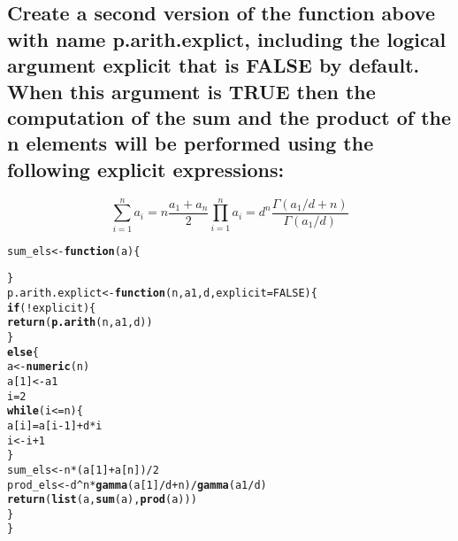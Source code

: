 \documentclass{article}\usepackage[]{graphicx}\usepackage[]{xcolor}
\makeatletter
\newcommand{\hlnum}[1]{\textcolor[rgb]{0.686,0.059,0.569}{#1}}%
\newcommand{\hlopt}[1]{\textcolor[rgb]{0,0,0}{#1}}%
\newcommand{\hldef}[1]{\textcolor[rgb]{0.345,0.345,0.345}{#1}}%
\newcommand{\hlkwa}[1]{\textcolor[rgb]{0.161,0.373,0.58}{\textbf{#1}}}%
\newcommand{\hlkwb}[1]{\textcolor[rgb]{0.69,0.353,0.396}{#1}}%
\newcommand{\hlkwc}[1]{\textcolor[rgb]{0.333,0.667,0.333}{#1}}%
\newcommand{\hlkwd}[1]{\textcolor[rgb]{0.737,0.353,0.396}{\textbf{#1}}}%
\newenvironment{kframe}{%
 \def\at@end@of@kframe{}%
 \ifinner\ifhmode%
  \def\at@end@of@kframe{\end{minipage}}%
  \begin{minipage}{\columnwidth}%
 \fi\fi%
 \def\FrameCommand##1{\hskip\@totalleftmargin \hskip-\fboxsep
 \colorbox{shadecolor}{##1}\hskip-\fboxsep
     \hskip-\linewidth \hskip-\@totalleftmargin \hskip\columnwidth}%
 \MakeFramed {\advance\hsize-\width
   \@totalleftmargin\z@ \linewidth\hsize
   \@setminipage}}%
 {\par\unskip\endMakeFramed%
 \at@end@of@kframe}
\newenvironment{knitrout}{}{} %
\makeatother
\begin{document}
\subsection{Create a second version of the function above with name p.arith.explict, including the logical argument explicit that is FALSE by default. When this argument is TRUE then the computation of the sum and the product of the n elements will be performed using the following explicit expressions:}
\[\sum_{i=1}^{n}a_i = n\frac{a_1+a_n}{2} \prod_{i=1}^{n}a_i = d^n\frac{\Gamma(a_1/d+n)}{\Gamma(a_1/d)}\]
\begin{knitrout}
\color{fgcolor}\begin{kframe}
\begin{alltt}
\hldef{sum_els}\hlkwb{<-}\hlkwa{function}\hldef{(}\hlkwc{a}\hldef{)\{}

\hldef{\}}
\hldef{p.arith.explict}\hlkwb{<-}\hlkwa{function}\hldef{(}\hlkwc{n}\hldef{,} \hlkwc{a1}\hldef{,} \hlkwc{d}\hldef{,} \hlkwc{explicit}\hldef{=}\hlnum{FALSE}\hldef{)\{}
  \hlkwa{if} \hldef{(}\hlopt{!}\hldef{explicit)\{}
    \hlkwd{return}\hldef{(}\hlkwd{p.arith}\hldef{(n,a1,d))}
  \hldef{\}}
  \hlkwa{else} \hldef{\{}
    \hldef{a}\hlkwb{<-}\hlkwd{numeric}\hldef{(n)}
    \hldef{a[}\hlnum{1}\hldef{]}\hlkwb{<-}\hldef{a1}
    \hldef{i}\hlkwb{=}\hlnum{2}
    \hlkwa{while} \hldef{(i}\hlopt{<=}\hldef{n)\{}
      \hldef{a[i]}\hlkwb{=}\hldef{a[i}\hlopt{-}\hlnum{1}\hldef{]}\hlopt{+}\hldef{d}\hlopt{*}\hldef{i}
      \hldef{i}\hlkwb{<-}\hldef{i}\hlopt{+}\hlnum{1}
    \hldef{\}}
    \hldef{sum_els}\hlkwb{<-}\hldef{n}\hlopt{*}\hldef{(a[}\hlnum{1}\hldef{]}\hlopt{+}\hldef{a[n])}\hlopt{/}\hlnum{2}
    \hldef{prod_els}\hlkwb{<-}\hldef{d}\hlopt{^}\hldef{n} \hlopt{*} \hlkwd{gamma}\hldef{(a[}\hlnum{1}\hldef{]}\hlopt{/}\hldef{d} \hlopt{+}\hldef{n)}\hlopt{/}\hlkwd{gamma}\hldef{(a1}\hlopt{/}\hldef{d)}
    \hlkwd{return} \hldef{(}\hlkwd{list}\hldef{(a,} \hlkwd{sum}\hldef{(a),} \hlkwd{prod}\hldef{(a)))}
  \hldef{\}}
\hldef{\}}
\end{alltt}
\end{kframe}
\end{knitrout}
\end{document}
